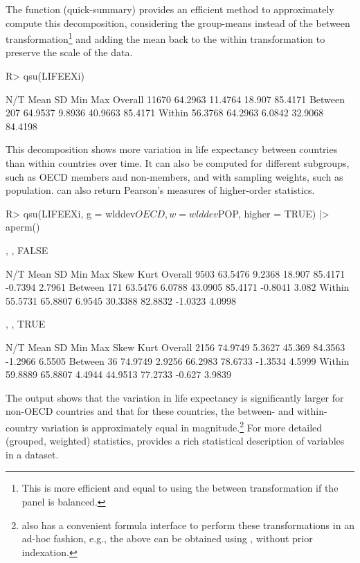 \documentclass[article]{jss}
\newcommand{\fct}[1]{\code{#1()}}
\begin{document}
%
The function \fct{qsu} (quick-summary) provides an efficient method to approximately compute this decomposition, considering the group-means instead of the between transformation\footnote{This is more efficient and equal to using the between transformation if the panel is balanced.} and adding the mean back to the within transformation to preserve the scale of the data.
%
\begin{Schunk}
\begin{Sinput}
R> qsu(LIFEEXi)
\end{Sinput}
\begin{Soutput}
             N/T     Mean       SD      Min      Max
Overall    11670  64.2963  11.4764   18.907  85.4171
Between      207  64.9537   9.8936  40.9663  85.4171
Within   56.3768  64.2963   6.0842  32.9068  84.4198
\end{Soutput}
\end{Schunk}
%
This decomposition shows more variation in life expectancy between countries than within countries over time. It can also be computed for different subgroups, such as OECD members and non-members, and with sampling weights, such as population. \fct{qsu} can also return Pearson's measures of higher-order statistics.
%
\begin{Schunk}
\begin{Sinput}
R> qsu(LIFEEXi, g = wlddev$OECD, w = wlddev$POP, higher = TRUE) |> aperm()
\end{Sinput}
\begin{Soutput}
, , FALSE

             N/T     Mean      SD      Min      Max     Skew    Kurt
Overall     9503  63.5476  9.2368   18.907  85.4171  -0.7394  2.7961
Between      171  63.5476  6.0788  43.0905  85.4171  -0.8041   3.082
Within   55.5731  65.8807  6.9545  30.3388  82.8832  -1.0323  4.0998

, , TRUE

             N/T     Mean      SD      Min      Max     Skew    Kurt
Overall     2156  74.9749  5.3627   45.369  84.3563  -1.2966  6.5505
Between       36  74.9749  2.9256  66.2983  78.6733  -1.3534  4.5999
Within   59.8889  65.8807  4.4944  44.9513  77.2733   -0.627  3.9839
\end{Soutput}
\end{Schunk}
%
The output shows that the variation in life expectancy is significantly larger for non-OECD countries and that for these countries, the between- and within-country variation is approximately equal in magnitude.\footnote{\fct{qsu} also has a convenient formula interface to perform these transformations in an ad-hoc fashion, e.g., the above can be obtained using , without prior indexation.} For more detailed (grouped, weighted) statistics, \fct{descr} provides a rich statistical description of variables in a dataset.
\end{document}
